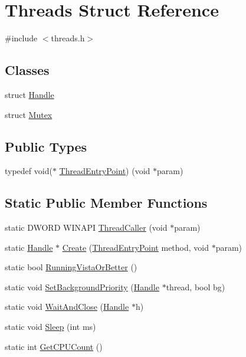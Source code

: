 \hypertarget{struct_threads}{}\section{Threads Struct Reference}
\label{struct_threads}


{\ttfamily \#include $<$threads.\+h$>$}

\subsection*{Classes}
\begin{DoxyCompactItemize}
\item 
struct \hyperlink{struct_threads_1_1_handle}{Handle}
\item 
struct \hyperlink{struct_threads_1_1_mutex}{Mutex}
\end{DoxyCompactItemize}
\subsection*{Public Types}
\begin{DoxyCompactItemize}
\item 
typedef void($\ast$ \hyperlink{struct_threads_a96d14421067bf938cfee477e206b9022}{Thread\+Entry\+Point}) (void $\ast$param)
\end{DoxyCompactItemize}
\subsection*{Static Public Member Functions}
\begin{DoxyCompactItemize}
\item 
static D\+W\+O\+RD W\+I\+N\+A\+PI \hyperlink{struct_threads_a35cf4a0021c66092e4947a867c2a0fc8}{Thread\+Caller} (void $\ast$param)
\item 
static \hyperlink{struct_threads_1_1_handle}{Handle} $\ast$ \hyperlink{struct_threads_ab6aa79b1b2c148b8d384916d58e2443e}{Create} (\hyperlink{struct_threads_a96d14421067bf938cfee477e206b9022}{Thread\+Entry\+Point} method, void $\ast$param)
\item 
static bool \hyperlink{struct_threads_aa2200fb0ef6f3664863e72b05849c8cb}{Running\+Vista\+Or\+Better} ()
\item 
static void \hyperlink{struct_threads_a3649871bed9522101859b446986e1a2e}{Set\+Background\+Priority} (\hyperlink{struct_threads_1_1_handle}{Handle} $\ast$thread, bool bg)
\item 
static void \hyperlink{struct_threads_a66c81807dee0d29c5ae6d254860e94d2}{Wait\+And\+Close} (\hyperlink{struct_threads_1_1_handle}{Handle} $\ast$h)
\item 
static void \hyperlink{struct_threads_a803a0b6899fb5e09ee7f56bd1986a287}{Sleep} (int ms)
\item 
static int \hyperlink{struct_threads_acb1d9a14cf18f2fcbc1bf07f51b4ba81}{Get\+C\+P\+U\+Count} ()
\end{DoxyCompactItemize}


